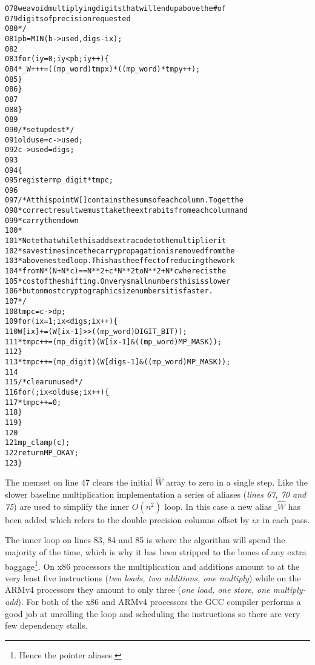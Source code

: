 \documentclass[b5paper]{book}
\begin{document}
\begin{small}
\begin{alltt}
078            we avoid multiplying digits that will end up above the # of
079            digits of precision requested
080          */
081         pb = MIN (b->used, digs - ix);
082   
083         for (iy = 0; iy < pb; iy++) \{
084           *_W++ += ((mp_word) tmpx) * ((mp_word) * tmpy++);
085         \}
086       \}
087   
088     \}
089   
090     /* setup dest */
091     olduse = c->used;
092     c->used = digs;
093   
094     \{
095       register mp_digit *tmpc;
096   
097       /* At this point W[] contains the sums of each column.  To get the
098        * correct result we must take the extra bits from each column and
099        * carry them down
100        *
101        * Note that while this adds extra code to the multiplier it 
102        * saves time since the carry propagation is removed from the 
103        * above nested loop.This has the effect of reducing the work 
104        * from N*(N+N*c)==N**2 + c*N**2 to N**2 + N*c where c is the 
105        * cost of the shifting.  On very small numbers this is slower 
106        * but on most cryptographic size numbers it is faster.
107        */
108       tmpc = c->dp;
109       for (ix = 1; ix < digs; ix++) \{
110         W[ix] += (W[ix - 1] >> ((mp_word) DIGIT_BIT));
111         *tmpc++ = (mp_digit) (W[ix - 1] & ((mp_word) MP_MASK));
112       \}
113       *tmpc++ = (mp_digit) (W[digs - 1] & ((mp_word) MP_MASK));
114   
115       /* clear unused */
116       for (; ix < olduse; ix++) \{
117         *tmpc++ = 0;
118       \}
119     \}
120   
121     mp_clamp (c);
122     return MP_OKAY;
123   \}
\end{alltt}
\end{small}

The memset on line 47 clears the initial $\hat W$ array to zero in a single step. Like the slower baseline multiplication
implementation a series of aliases (\textit{lines 67, 70 and 75}) are used to simplify the inner $O(n^2)$ loop.  
In this case a new alias $\_\hat W$ has been added which refers to the double precision columns offset by $ix$ in each pass.  

The inner loop on lines 83, 84 and 85 is where the algorithm will spend the majority of the time, which is why it has been 
stripped to the bones of any extra baggage\footnote{Hence the pointer aliases.}.  On x86 processors the multiplication and additions amount to at the 
very least five instructions (\textit{two loads, two additions, one multiply}) while on the ARMv4 processors they amount to only three 
(\textit{one load, one store, one multiply-add}).   For both of the x86 and ARMv4 processors the GCC compiler performs a good job at unrolling the loop 
and scheduling the instructions so there are very few dependency stalls.
\end{document}
